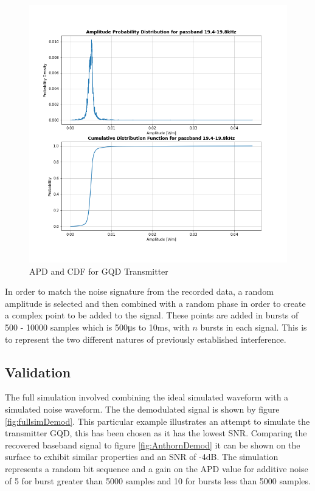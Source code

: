 \begin{figure}[h!]
    \centering
    \includegraphics[width = \textwidth]{figs/sim/apdcdf.png}
    \caption{APD and CDF for GQD Transmitter}
    \label{fig:apdcdf}
\end{figure}

In order to match the noise signature from the recorded data, a random amplitude is selected and then combined with a random phase in order to create a complex point to be added to the signal. These points are added in bursts of 500 - 10000 samples which is 500\si{\micro\second} to 10\si{\milli\second}, with $n$ bursts in each signal. This is to represent the two different natures of previously established interference.

\pagebreak
\subsection{Validation}
The full simulation involved combining the ideal simulated waveform with a simulated noise waveform. The the demodulated signal is shown by figure \ref{fig:fullsimDemod}. This particular example illustrates an attempt to simulate the transmitter GQD, this has been chosen as it has the lowest SNR. Comparing the recovered baseband signal to figure \ref{fig:AnthornDemod} it can be shown on the surface to exhibit similar properties and an SNR of -4dB. The simulation represents a random bit sequence and a gain on the APD value for additive noise of 5 for burst greater than 5000 samples and 10 for bursts less than 5000 samples.

